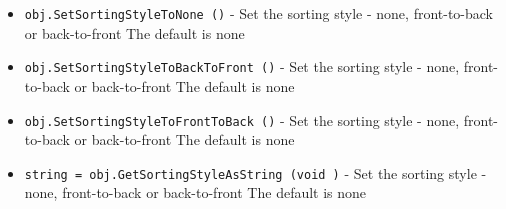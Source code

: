 \begin{itemize}
\item  \verb|obj.SetSortingStyleToNone ()| -  Set the sorting style - none, front-to-back or back-to-front
 The default is none

\item  \verb|obj.SetSortingStyleToBackToFront ()| -  Set the sorting style - none, front-to-back or back-to-front
 The default is none

\item  \verb|obj.SetSortingStyleToFrontToBack ()| -  Set the sorting style - none, front-to-back or back-to-front
 The default is none

\item  \verb|string = obj.GetSortingStyleAsString (void )| -  Set the sorting style - none, front-to-back or back-to-front
 The default is none

\end{itemize}
